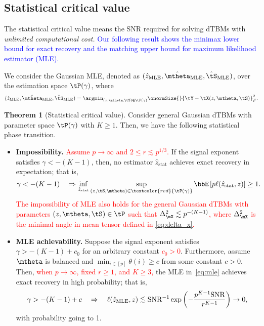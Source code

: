 \documentclass[lettersize,onecolumn,journal]{IEEEtran}
\theoremstyle{definition}
\newtheorem{thm}{Theorem}
\theoremstyle{definition}
\begin{document}
\subsection{Statistical critical value}\label{sec:statlimit}
The statistical critical value means the SNR required for solving dTBMs with \emph{unlimited computational cost.} \textcolor{blue}{Our following result shows the minimax lower bound for exact recovery and the matching upper bound for maximum likelihood estimator (MLE). }
{
\color{blue} We consider the Gaussian MLE, denoted as $(\hat z_{\text{MLE}}, \hat \mtheta_{\text{MLE}}, \hat \tS_{\text{MLE}})$, over the estimation space $\tP(\gamma)$, where 
\begin{equation}\label{eq:mle}
    (\hat z_{\text{MLE}}, \hat \mtheta_{\text{MLE}}, \hat \tS_{\text{MLE}}) = \argmin_{ (z, \mtheta, \tS) \in \tP (\gamma)} \onormSize{}{\tY - \tX(z,\mtheta, \tS)}_F^2.
\end{equation}

\begin{thm}[Statistical critical value]\label{thm:stats} Consider general Gaussian dTBMs with parameter space $\tP(\gamma)$ with $K\geq 1$. Then, we have the following statistical phase transition. 

\begin{itemize}[wide]
    \item \textbf{Impossibility.} \textcolor{red}{Assume $p \rightarrow \infty$ and $2 \leq r\lesssim p^{1/3}$.} If the signal exponent satisfies $\gamma < -(K-1)$, then, no estimator $\hat z_{\text{stat}}$ achieves exact recovery in expectation; that is,
\begin{equation}
  \gamma< -(K-1) \quad \Rightarrow  \inf_{\hat z_{\text{stat}}}\sup_{(z, \tS, \mtheta)\in \textcolor{red}{\tP(\gamma)}} \bbE \left[ p\ell(\hat z_{\text{stat}}, z) \right]\geq 1.
\end{equation}
\textcolor{red}{The impossibility of MLE also holds for the general Gaussian dTBMs with parameters $(z, \mtheta, \tS) \in \tP$ such that $\Delta_{\mX}^2 \lesssim p^{-(K-1)}$, where $\Delta_{\mX}^2$ is the minimal angle in mean tensor defined in \eqref{eq:delta_x}.}

\item \textbf{MLE achievability.} Suppose the signal exponent satisfies $\gamma >-(K-1)+c_0$ for an arbitrary constant \textcolor{red}{$c_0>0$}. Furthermore, assume \textcolor{red}{$\mtheta$} is balanced and $\min_{i\in[p]}\theta(i)\geq c$ from some constant $c>0$. Then, \textcolor{red}{when $p \rightarrow \infty$, fixed $r \geq 1$, and $K \geq 3$, }the MLE in~\eqref{eq:mle} achieves exact recovery in high probability; that is,
\begin{equation}
\gamma> -(K-1)+c \quad  \Rightarrow  \quad \ell(\hat z_{\text{MLE}}, z) \lesssim \text{SNR}^{-1}\exp\left(-{p^{K-1}\text{SNR}\over r^{K-1}}\right) \to 0,
\end{equation}
with probability going to 1. 
\end{itemize}
\end{thm}

}
\end{document}
